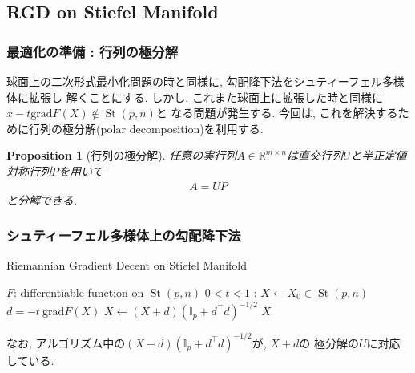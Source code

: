\documentclass[dvipdfmx,11pt]{beamer}		%
\newtheorem{prop}[defi]{Proposition}
\newcommand{\R}{\mathbb{R}}
\begin{document}
    \subsection{RGD on Stiefel Manifold}
    \begin{frame}
        \frametitle{最適化の準備 : 行列の極分解}
        球面上の二次形式最小化問題の時と同様に, 勾配降下法をシュティーフェル多様体に拡張し
        解くことにする. しかし, これまた球面上に拡張した時と同様に$x - t\mathrm{grad}F(X)\notin\operatorname{St}(p, n)$と
        なる問題が発生する. 今回は, これを解決するために行列の極分解(polar decomposition)を利用する.
        \begin{prop}[行列の極分解]
            任意の実行列$A\in\R^{m\times n}$は直交行列$U$と半正定値対称行列$P$を用いて
            \begin{align*}
                A = UP
            \end{align*}
            と分解できる. 
        \end{prop}
    \end{frame}
    \begin{frame}
        \frametitle{シュティーフェル多様体上の勾配降下法}
        \begin{algorithm}[H]
            \caption{Riemannian Gradient Decent on Stiefel Manifold}
            \begin{algorithmic}
                \REQUIRE $F$: differentiable function on $\operatorname{St}(p, n)$
                \REQUIRE $0< t <1$ : 
                \STATE $X\leftarrow X_{0}\in\operatorname{St}(p, n)$
                \STATE $d = -t~\mathrm{grad} F(X)$
                \STATE $X\leftarrow (X + d)(\mathbb{I}_{p} + d^{\top}d)^{-1/2}$ 
                \ENDWHILE
                \RETURN $X$
            \end{algorithmic}
        \end{algorithm}
        なお, アルゴリズム中の$(X + d)(\mathbb{I}_{p} + d^{\top}d)^{-1/2}$が, $X + d$の
        極分解の$U$に対応している. 
    \end{frame}
\end{document}
